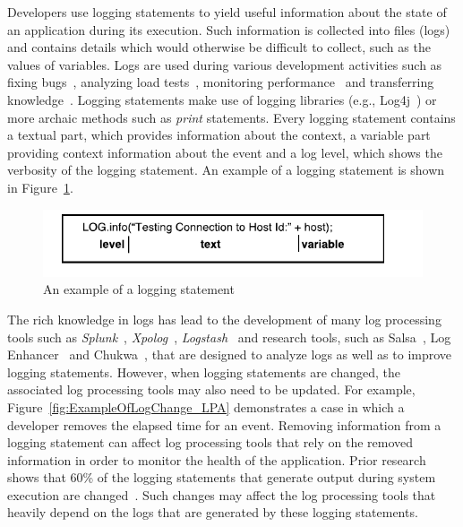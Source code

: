 

Developers use logging statements to yield useful information about the state of an application during its execution. Such information is collected into files (logs) and contains details which would otherwise be difficult to collect, such as the values of variables. Logs are used during various development activities such as fixing bugs~\cite{ConsoleLogs,JGLouMining,QFuanomaly}, analyzing load tests~\cite{Automatic}, monitoring performance~\cite{Yuan} and transferring knowledge~\cite{IanWCRE}.
Logging statements make use of logging libraries (e.g., Log4j~\cite{log4j}) or more archaic methods such as \textsl{print} statements. Every logging statement contains a textual part, which provides information about the context, a variable part providing context information about the event and a log level, which shows the verbosity of the logging statement. An example of a logging statement is shown in Figure~\ref{fig:logexample}.

\begin{figure}[tb]
	\centering
	\includegraphics[width=1\columnwidth]{logexample}
	\caption{An example of a logging statement}
	\label{fig:logexample}
\end{figure}




The rich knowledge in logs has lead to the development of many log processing tools such as \textsl{Splunk}~\cite{carasso2012exploring}, \textsl{Xpolog}~\cite{xpolog}, \textsl{Logstash}~\cite{xu2013detecting} and research tools, such as Salsa~\cite{TanSalsa}, Log Enhancer~\cite{Yuan} and Chukwa~\cite{chukwa}, that are designed to analyze logs as well as to improve logging statements. However, when logging statements are changed, the associated log processing tools may also need to be updated. For example, Figure~\ref{fig:ExampleOfLogChange_LPA} demonstrates a case in which a developer removes the elapsed time for an event. Removing information from a logging statement can affect log processing tools that rely on the removed information in order to monitor the health of the application. Prior research shows that 60\% of the logging statements that generate output during system execution are changed~\cite{IanWCRE}. Such changes may affect the log processing tools that heavily depend on the logs that are generated by these logging statements.

